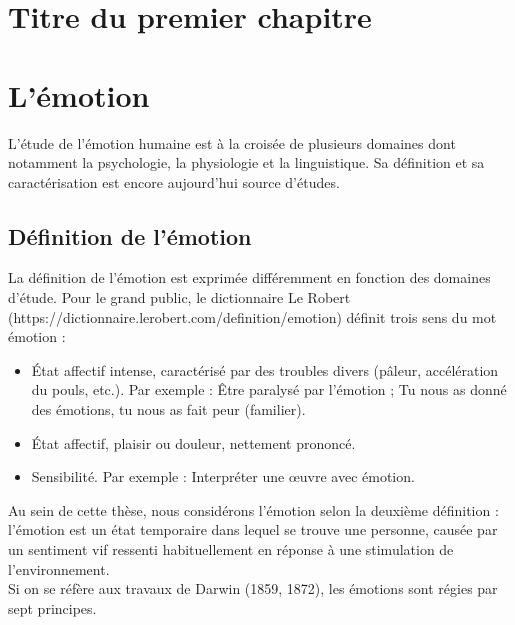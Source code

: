 
\clearemptydoublepage
\chapter{Titre du premier chapitre}

\chapter{L'émotion}

L'étude de l'émotion humaine est à la croisée de plusieurs domaines dont notamment la psychologie, la physiologie et la linguistique. Sa définition et sa caractérisation est encore aujourd'hui source d'études.

\section{Définition de l'émotion}
La définition de l'émotion est exprimée différemment en fonction des domaines d'étude. Pour le grand public, le dictionnaire Le Robert (https://dictionnaire.lerobert.com/definition/emotion) définit trois sens du mot émotion :
\begin{itemize}
    \item État affectif intense, caractérisé par des troubles divers (pâleur, accélération du pouls, etc.). Par exemple : Être paralysé par l'émotion ; Tu nous as donné des émotions, tu nous as fait peur (familier).
    \item État affectif, plaisir ou douleur, nettement prononcé.
    \item Sensibilité. Par exemple : Interpréter une œuvre avec émotion.
\end{itemize}
Au sein de cette thèse, nous considérons l'émotion selon la deuxième définition : l'émotion est un état temporaire dans lequel se trouve une personne, causée par un sentiment vif ressenti habituellement en réponse à une stimulation de l'environnement. \\
Si on se réfère aux travaux de Darwin (1859, 1872), les émotions sont régies par sept principes.
